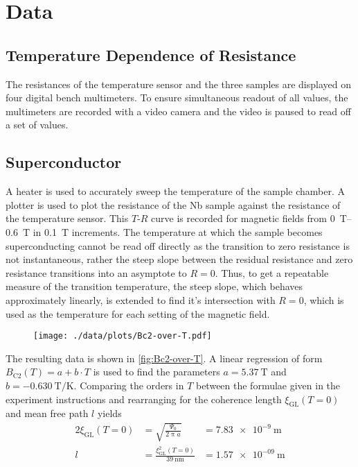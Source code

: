 \chapter{Data}
\section{Temperature Dependence of Resistance}
The resistances of the temperature sensor and the three samples are displayed on four digital bench multimeters.
To ensure simultaneous readout of all values, the multimeters are recorded with a video camera and the video is paused to read off a set of values.

\section{Superconductor}
A heater is used to accurately sweep the temperature of the sample chamber.
A plotter is used to plot the resistance of the Nb sample against the resistance of the temperature sensor.
This $T$-$R$ curve is recorded for magnetic fields from \SIrange{0}{0.6}{\tesla} in \SI{0.1}{\tesla} increments.
The temperature at which the sample becomes superconducting cannot be read off directly as the transition to zero resistance is not instantaneous, rather the steep slope between the residual resistance and zero resistance transitions into an asymptote to $R = 0$.
Thus, to get a repeatable measure of the transition temperature, the steep slope, which behaves approximately linearly, is extended to find it's intersection with $R = 0$, which is used as the temperature for each setting of the magnetic field.
\begin{figure}
	\centering
	\texttt{[image: ./data/plots/Bc2-over-T.pdf]}
	\label{fig:Bc2-over-T}
\end{figure}
The resulting data is shown in \autoref{fig:Bc2-over-T}.
A linear regression of form $B_\text{C2}(T) = a + b \cdot T$ is used to find the parameters $a = \SI{5.37}{\tesla}$ and $b = \SI{-0.630}{\tesla\per\kelvin}$.
Comparing the orders in $T$ between the formulae given in the experiment instructions and rearranging for the coherence length $\xi_\text{GL}(T = 0)$ and mean free path $l$ yields
\begin{alignat*}{2}
	\xi_\text{GL}(T = 0) &= \sqrt{\frac{\Psi_0}{2 \uppi a}} &= \SI{7.83e-9}{\meter}\\
	l &= \frac{\xi^2_\text{GL}(T = 0)}{\SI{39}{\nano\meter}} &= \SI{1.57e-09}{\meter}
\end{alignat*}
